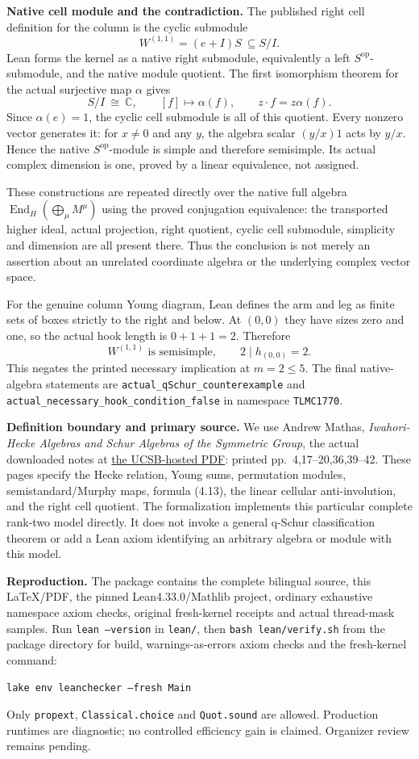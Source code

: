 \documentclass[11pt]{article}
\newcommand{\C}{\mathbb C}
\newcommand{\End}{\operatorname{End}}
\begin{document}
\newpage
\textbf{Native cell module and the contradiction.}
The published right cell definition for the column is the cyclic
submodule
\[
 W^{(1,1)}=(e+I)S\ \subseteq S/I.
\]
Lean forms the kernel as a native right submodule, equivalently a left
$S^{\mathrm{op}}$-submodule, and the native module quotient. The first
isomorphism theorem for the actual surjective map $\alpha$ gives
\[
 S/I\ \cong\ \C,\qquad [f]\longmapsto\alpha(f),\qquad
 z\cdot f=z\alpha(f).
\]
Since $\alpha(e)=1$, the cyclic cell submodule is all of this quotient.
Every nonzero vector generates it: for $x\ne0$ and any $y$, the algebra
scalar $(y/x)1$ acts by $y/x$. Hence the native
$S^{\mathrm{op}}$-module is simple and therefore semisimple. Its actual
complex dimension is one, proved by a linear equivalence, not assigned.

These constructions are repeated directly over the native full algebra
$\End_H(\bigoplus_\mu M^\mu)$ using the proved conjugation equivalence:
the transported higher ideal, actual projection, right quotient, cyclic
cell submodule, simplicity and dimension are all present there. Thus the
conclusion is not merely an assertion about an unrelated coordinate
algebra or the underlying complex vector space.

For the genuine column Young diagram, Lean defines the arm and leg as
finite sets of boxes strictly to the right and below. At $(0,0)$ they have
sizes zero and one, so the actual hook length is $0+1+1=2$. Therefore
\[
 W^{(1,1)}\text{ is semisimple},\qquad 2\mid h_{(0,0)}=2.
\]
This negates the printed necessary implication at $m=2\le5$.
The final native-algebra statements are
\texttt{actual\_qSchur\_counterexample} and
\texttt{actual\_necessary\_hook\_condition\_false}
in namespace \texttt{TLMC1770}.

\textbf{Definition boundary and primary source.}
We use Andrew Mathas, \emph{Iwahori-Hecke Algebras and Schur Algebras of
the Symmetric Group}, the actual downloaded notes at
\href{https://web.math.ucsb.edu/~bigelow/books/mathas.pdf}{the UCSB-hosted PDF}:
printed pp.~4,17--20,36,39--42. These pages specify the Hecke relation,
Young sums, permutation modules, semistandard/Murphy maps, formula (4.13),
the linear cellular anti-involution, and the right cell quotient.
The formalization implements this particular complete rank-two model
directly. It does not invoke a general q-Schur classification theorem or
add a Lean axiom identifying an arbitrary algebra or module with this model.

\textbf{Reproduction.}
The package contains the complete bilingual source, this LaTeX/PDF,
the pinned Lean4.33.0/Mathlib project, ordinary exhaustive namespace
axiom checks, original fresh-kernel receipts and actual thread-mask samples.
Run \texttt{lean --version} in \texttt{lean/}, then
\texttt{bash lean/verify.sh} from the package directory for build,
warnings-as-errors axiom checks and the fresh-kernel command:
\begin{center}\texttt{lake env leanchecker --fresh Main}\end{center}
Only \texttt{propext}, \texttt{Classical.choice} and \texttt{Quot.sound}
are allowed. Production runtimes are diagnostic; no controlled efficiency
gain is claimed. Organizer review remains pending.
\end{document}
